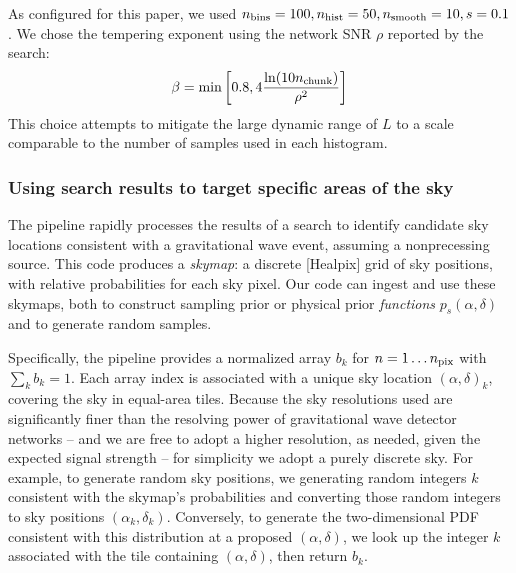 As configured for this paper, we used $n_{\rm bins}=100, n_{\rm hist}=50,n_{\rm smooth}=10,s=0.1$.  We chose the
tempering exponent using the network SNR $\rho$ reported by the search:
\begin{eqnarray}
\beta = \text{min} \left[ 0.8, 4 \frac{\ln (10 n_{\rm chunk})}{\rho^2} \right]
\end{eqnarray}
This choice attempts to mitigate the large dynamic range of $L$ to a scale comparable to the number of samples used in
each histogram.  










\subsubsection{Using search results to target specific areas of the sky}

The \BS{} pipeline \cite{gw-astro-Bayestar} rapidly processes the results of a search to identify candidate sky
locations consistent with a gravitational wave event, assuming a nonprecessing source.   
%
This code produces a \emph{skymap}: a discrete [Healpix] grid of sky positions, with relative probabilities for each sky
pixel.  
%
Our code can ingest and use these skymaps,  both to construct sampling prior or physical prior \emph{functions}
$p_s(\alpha,\delta)$ and to generate random samples. 

Specifically, the \BS{} pipeline provides a normalized array  $b_k$  for $n=1\ldots n_{\rm pix}$ with $\sum_k b_k=1$.    
Each array index is associated with a unique sky location $(\alpha,\delta)_k $, covering the sky in equal-area tiles.  
%
Because the sky resolutions used are  significantly finer than the resolving power of gravitational wave detector
networks -- and we are free to adopt a higher resolution, as needed, given the expected signal strength -- 
 for simplicity we adopt a purely discrete sky.  For example, to generate  random sky positions, we generating random integers $k$ consistent with
the skymap's probabilities and converting those random integers to sky positions $(\alpha_k,\delta_k)$.  Conversely, to
generate the two-dimensional PDF consistent with this distribution at a proposed $(\alpha,\delta)$, we look up the
integer $k$ associated with the tile containing $(\alpha,\delta)$, then return $b_k$.  



